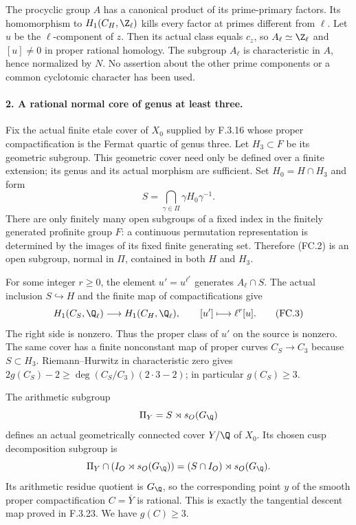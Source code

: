 The procyclic group $A$ has a canonical product of
its prime-primary factors. Its homomorphism to
$H_1(C_H,\Z_\ell)$ kills every factor at primes
different from $\ell$. Let $u$ be the $\ell$-component
of $z$. Then its actual class equals $c_z$, so
$A_\ell\simeq\Z_\ell$ and $[u]\ne0$ in proper
rational homology. The subgroup $A_\ell$ is
characteristic in $A$, hence normalized by $N$.
No assertion about the other prime components
or a common cyclotomic character has been used.

\paragraph{2. A rational normal core of genus at least three.}
Fix the actual finite etale cover of $X_0$ supplied
by F.3.16 whose proper compactification is the
Fermat quartic of genus three. Let $H_3\subset F$
be its geometric subgroup. This geometric cover
need only be defined over a finite extension;
its genus and its actual morphism are sufficient.
Set $H_0=H\cap H_3$ and form
\[
                  S=\bigcap_{\gamma\in\Pi}
                          \gamma H_0\gamma^{-1}.           \tag{FC.2}
\]
There are only finitely many open subgroups of a
fixed index in the finitely generated profinite
group $F$: a continuous permutation representation
is determined by the images of its fixed finite
generating set. Therefore (FC.2) is an open
subgroup, normal in $\Pi$, contained in both
$H$ and $H_3$.

For some integer $r\geq0$, the element
$u'=u^{\ell^r}$ generates $A_\ell\cap S$.
The actual inclusion $S\hookrightarrow H$ and
the finite map of compactifications give
\[
 H_1(C_S,\Q_\ell)\longrightarrow H_1(C_H,\Q_\ell),
                    \qquad [u']\longmapsto\ell^r[u].       \tag{FC.3}
\]
The right side is nonzero. Thus the proper class
of $u'$ on the source is nonzero. The same cover
has a finite nonconstant map of proper curves
$C_S\to C_3$ because $S\subset H_3$.
Riemann--Hurwitz in characteristic zero gives
$2g(C_S)-2\geq\deg(C_S/C_3)(2\cdot3-2)$;
in particular $g(C_S)\geq3$.

The arithmetic subgroup
\[
                     \Pi_Y=S\rtimes s_O(G_\Q)
\]
defines an actual geometrically connected cover
$Y/\Q$ of $X_0$. Its chosen cusp decomposition
subgroup is
\[
 \Pi_Y\cap(I_O\rtimes s_O(G_\Q))
                  =(S\cap I_O)\rtimes s_O(G_\Q).
\]
Its arithmetic residue quotient is $G_\Q$, so
the corresponding point $y$ of the smooth proper
compactification $C=\overline Y$ is rational.
This is exactly the tangential descent map
proved in F.3.23. We have $g(C)\geq3$.

